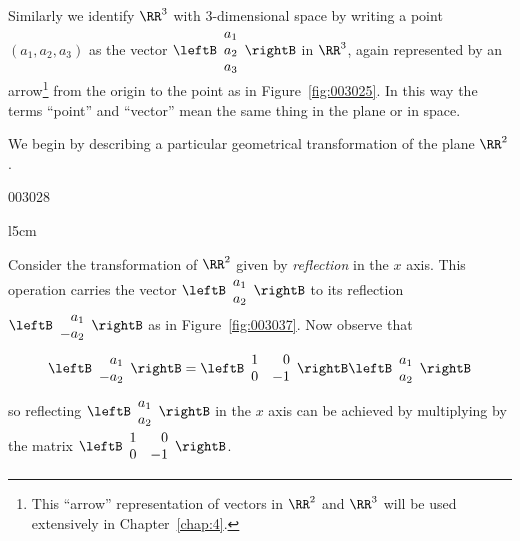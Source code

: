 Similarly we identify $\RR^3$ with $3$-dimensional space by writing a point $(a_{1}, a_{2}, a_{3})$ as the vector $\leftB \begin{array}{c}
a_{1} \\
a_{2} \\
a_{3}
\end{array} \rightB$
 in $\RR^3$, again represented by an arrow\footnote{This ``arrow'' representation of vectors in $\RR^2$ and $\RR^3$ will be used extensively in Chapter~\ref{chap:4}.}
 from the origin to the point as in Figure~\ref{fig:003025}. In this way the terms ``point'' and ``vector'' mean the same thing in the plane or in space.

We begin by describing a particular geometrical transformation of the plane $\RR^2$.
\vspace{1em}

\begin{example}{}{003028}

\begin{wrapfigure}[8]{l}{5cm}
	\centering
	
	\caption{\label{fig:003037}}
\end{wrapfigure}

\setlength{\rightskip}{0pt plus 200pt}
Consider the transformation of $\RR^2$ given by \textit{reflection} in the $x$ axis. This operation carries the vector $\leftB \begin{array}{c}
a_{1} \\
a_{2}
\end{array} \rightB$
 to its reflection $\leftB \begin{array}{r}
 a_{1} \\
 -a_{2}
 \end{array} \rightB$
 as in Figure~\ref{fig:003037}. Now observe that
\begin{equation*}
\leftB \begin{array}{r}
a_{1} \\
-a_{2}
\end{array} \rightB = \leftB \begin{array}{rr}
1 & 0 \\
0 & -1
\end{array} \rightB \leftB \begin{array}{c}
a_{1} \\
a_{2}
\end{array} \rightB
\end{equation*}
so reflecting $\leftB \begin{array}{c}
a_{1} \\
a_{2}
\end{array} \rightB$
 in the $x$ axis can be achieved by multiplying by the matrix 
 $\leftB \begin{array}{rr}
 1 & 0 \\
 0 & -1
 \end{array} \rightB$.
\end{example}



